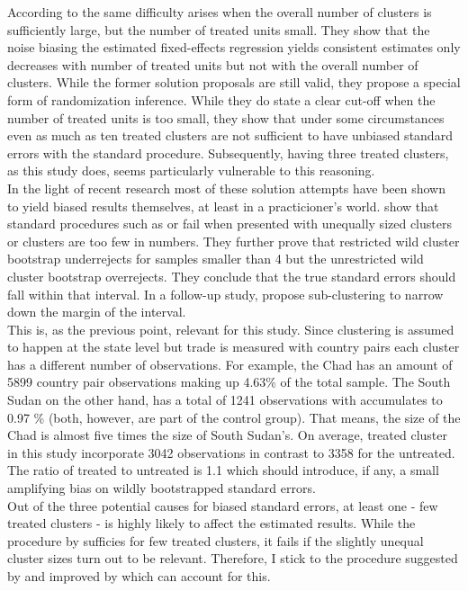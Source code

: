 \documentclass{article}
\begin{document}
According to \cite{conley2011inference} the same difficulty arises when the overall number of clusters is sufficiently large, but the number of treated units small. They show that the noise biasing the estimated fixed-effects regression yields consistent estimates only decreases with number of treated units but not with the overall number of clusters. While the former solution proposals are still valid, they propose a special form of randomization inference. While they do state a clear cut-off when the number of treated units is too small, they show that under some circumstances even as much as ten treated clusters are not sufficient to have unbiased standard errors with the standard procedure. Subsequently, having three treated clusters, as this study does, seems particularly vulnerable to this reasoning. \\
In the light of recent research most of these solution attempts have been shown to yield biased results themselves, at least in a practicioner's world. \cite{mackinnon2017wild} show that standard procedures such as \cite{bertrand2004much} or \cite{cameron2008bootstrap} fail when presented with unequally sized clusters or clusters are too few in numbers. They further prove that restricted wild cluster bootstrap underrejects for samples smaller than 4 but the unrestricted wild cluster bootstrap overrejects. They conclude that the true standard errors should fall within that interval. In a follow-up study, \cite{mackinnon2018wild} propose sub-clustering to narrow down the margin of the interval. \\
This is, as the previous point, relevant for this study. Since clustering is assumed to happen at the state level but trade is measured with country pairs each cluster has a different number of observations. For example, the Chad has an amount of 5899 country pair observations making up 4.63\% of the total sample. The South Sudan on the other hand, has a total of 1241 observations with accumulates to 0.97 \% (both, however, are part of the control group). That means, the size of the Chad is almost five times the size of South Sudan's. On average, treated cluster in this study incorporate 3042 observations in contrast to 3358 for the untreated. The ratio of treated to untreated is 1.1 which should introduce, if any, a small amplifying bias on wildly bootstrapped standard errors. \\
Out of the three potential causes for biased standard errors, at least one - few treated clusters - is highly likely to affect the estimated results. While the procedure by \cite{conley2011inference} sufficies for few treated clusters, it fails if the slightly unequal cluster sizes turn out to be relevant. Therefore, I stick to the procedure suggested by \cite{cameron2008bootstrap} and improved by \cite{mackinnon2018wild} which can account for this.
\end{document}
